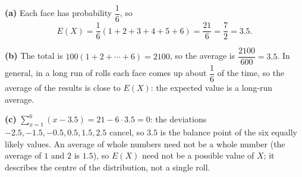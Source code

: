 \textbf{(a)} Each face has probability $\dfrac16$, so
\[E(X)=\dfrac16(1+2+3+4+5+6)=\dfrac{21}{6}=\boxed{\dfrac72=3.5}.\]

\textbf{(b)} The total is $100(1+2+\cdots+6)=2100$, so the average is $\dfrac{2100}{600}=3.5$. In general, in a long run of rolls each face comes up about $\dfrac16$ of the time, so the average of the results is close to $E(X)$: the expected value is a long-run average.

\textbf{(c)} $\sum_{x=1}^{6}(x-3.5)=21-6\cdot3.5=0$: the deviations $-2.5,-1.5,-0.5,0.5,1.5,2.5$ cancel, so $3.5$ is the balance point of the six equally likely values. An average of whole numbers need not be a whole number (the average of $1$ and $2$ is $1.5$), so $E(X)$ need not be a possible value of $X$; it describes the centre of the distribution, not a single roll.
